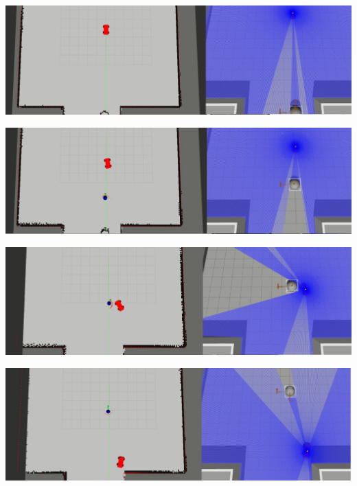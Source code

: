 \begin{minipage}{\textwidth}
    \includegraphics[width=\textwidth]{figures/raw/jpeg/local_planner_test_straight_traj_dyn_obj_1.jpg}

    \vspace{0.5cm}
    \includegraphics[width=\textwidth]{figures/raw/jpeg/local_planner_test_straight_traj_dyn_obj_2.jpg}

    \vspace{0.5cm}
    \includegraphics[width=\textwidth]{figures/raw/jpeg/local_planner_test_straight_traj_dyn_obj_3.jpg}

    \vspace{0.5cm}
    \includegraphics[width=\textwidth]{figures/raw/jpeg/local_planner_test_straight_traj_dyn_obj_4.jpg}

    \label{local_planner_test_straight_traj_dyn_obj}
\end{minipage}


